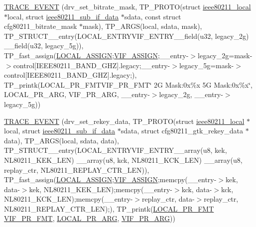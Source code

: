 \begin{DoxyCompactItemize}
\item 
\hyperlink{driver-trace_8h_a2acf93e539fcb96cec827c3eb59efd7c}{T\-R\-A\-C\-E\-\_\-\-E\-V\-E\-N\-T} (drv\-\_\-set\-\_\-bitrate\-\_\-mask, T\-P\-\_\-\-P\-R\-O\-T\-O(struct \hyperlink{structieee80211__local}{ieee80211\-\_\-local} $\ast$local, struct \hyperlink{structieee80211__sub__if__data}{ieee80211\-\_\-sub\-\_\-if\-\_\-data} $\ast$sdata, const struct cfg80211\-\_\-bitrate\-\_\-mask $\ast$mask), T\-P\-\_\-\-A\-R\-G\-S(local, sdata, mask), T\-P\-\_\-\-S\-T\-R\-U\-C\-T\-\_\-\-\_\-entry(L\-O\-C\-A\-L\-\_\-\-E\-N\-T\-R\-Y\-V\-I\-F\-\_\-\-E\-N\-T\-R\-Y\-\_\-\-\_\-field(u32, legacy\-\_\-2g) \-\_\-\-\_\-field(u32, legacy\-\_\-5g)), T\-P\-\_\-fast\-\_\-assign(\hyperlink{driver-trace_8h_ab19d9141887ea92ef9640df06a51e0a1}{L\-O\-C\-A\-L\-\_\-\-A\-S\-S\-I\-G\-N};\hyperlink{driver-trace_8h_af5ede80f04ffcb3f644f68837b1d252c}{V\-I\-F\-\_\-\-A\-S\-S\-I\-G\-N};\-\_\-\-\_\-entry-\/$>$legacy\-\_\-2g=mask-\/$>$control\mbox{[}I\-E\-E\-E80211\-\_\-\-B\-A\-N\-D\-\_\-G\-H\-Z\mbox{]}.legacy;\-\_\-\-\_\-entry-\/$>$legacy\-\_\-5g=mask-\/$>$control\mbox{[}I\-E\-E\-E80211\-\_\-\-B\-A\-N\-D\-\_\-G\-H\-Z\mbox{]}.legacy;), T\-P\-\_\-printk(L\-O\-C\-A\-L\-\_\-\-P\-R\-\_\-\-F\-M\-T\-V\-I\-F\-\_\-\-P\-R\-\_\-\-F\-M\-T\char`\"{} 2\-G Mask\-:0x\%x 5\-G Mask\-:0x\%x\char`\"{}, L\-O\-C\-A\-L\-\_\-\-P\-R\-\_\-\-A\-R\-G, V\-I\-F\-\_\-\-P\-R\-\_\-\-A\-R\-G, \-\_\-\-\_\-entry-\/$>$legacy\-\_\-2g, \-\_\-\-\_\-entry-\/$>$legacy\-\_\-5g))
\item 
\hyperlink{driver-trace_8h_aa5ce13be22a5cb7fcf9c2258aee581b7}{T\-R\-A\-C\-E\-\_\-\-E\-V\-E\-N\-T} (drv\-\_\-set\-\_\-rekey\-\_\-data, T\-P\-\_\-\-P\-R\-O\-T\-O(struct \hyperlink{structieee80211__local}{ieee80211\-\_\-local} $\ast$local, struct \hyperlink{structieee80211__sub__if__data}{ieee80211\-\_\-sub\-\_\-if\-\_\-data} $\ast$sdata, struct cfg80211\-\_\-gtk\-\_\-rekey\-\_\-data $\ast$data), T\-P\-\_\-\-A\-R\-G\-S(local, sdata, data), T\-P\-\_\-\-S\-T\-R\-U\-C\-T\-\_\-\-\_\-entry(L\-O\-C\-A\-L\-\_\-\-E\-N\-T\-R\-Y\-V\-I\-F\-\_\-\-E\-N\-T\-R\-Y\-\_\-\-\_\-array(u8, kek, N\-L80211\-\_\-\-K\-E\-K\-\_\-\-L\-E\-N) \-\_\-\-\_\-array(u8, kck, N\-L80211\-\_\-\-K\-C\-K\-\_\-\-L\-E\-N) \-\_\-\-\_\-array(u8, replay\-\_\-ctr, N\-L80211\-\_\-\-R\-E\-P\-L\-A\-Y\-\_\-\-C\-T\-R\-\_\-\-L\-E\-N)), T\-P\-\_\-fast\-\_\-assign(\hyperlink{driver-trace_8h_ab19d9141887ea92ef9640df06a51e0a1}{L\-O\-C\-A\-L\-\_\-\-A\-S\-S\-I\-G\-N};\hyperlink{driver-trace_8h_af5ede80f04ffcb3f644f68837b1d252c}{V\-I\-F\-\_\-\-A\-S\-S\-I\-G\-N};memcpy(\-\_\-\-\_\-entry-\/$>$kek, data-\/$>$kek, N\-L80211\-\_\-\-K\-E\-K\-\_\-\-L\-E\-N);memcpy(\-\_\-\-\_\-entry-\/$>$kck, data-\/$>$kck, N\-L80211\-\_\-\-K\-C\-K\-\_\-\-L\-E\-N);memcpy(\-\_\-\-\_\-entry-\/$>$replay\-\_\-ctr, data-\/$>$replay\-\_\-ctr, N\-L80211\-\_\-\-R\-E\-P\-L\-A\-Y\-\_\-\-C\-T\-R\-\_\-\-L\-E\-N);), T\-P\-\_\-printk(\hyperlink{driver-trace_8h_a09833af423135e21ffe99a59ae088cf1}{L\-O\-C\-A\-L\-\_\-\-P\-R\-\_\-\-F\-M\-T} \hyperlink{driver-trace_8h_a50711161ccfc99a73b43b988149a61a5}{V\-I\-F\-\_\-\-P\-R\-\_\-\-F\-M\-T}, \hyperlink{driver-trace_8h_aa2a77a17621ecb4f0b3926fec90a5538}{L\-O\-C\-A\-L\-\_\-\-P\-R\-\_\-\-A\-R\-G}, \hyperlink{driver-trace_8h_a12c9f3afcd1c461f7ae2f86fd8503977}{V\-I\-F\-\_\-\-P\-R\-\_\-\-A\-R\-G}))

\end{DoxyCompactItemize}
